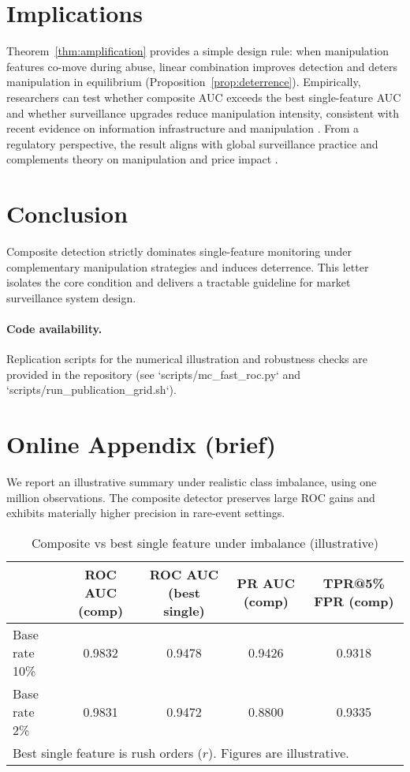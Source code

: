 \documentclass[preprint,12pt,authoryear]{elsarticle}
\begin{document}
\section{Implications}
Theorem~\ref{thm:amplification} provides a simple design rule: when manipulation features co-move during abuse, linear combination improves detection and deters manipulation in equilibrium (Proposition~\ref{prop:deterrence}). Empirically, researchers can test whether composite AUC exceeds the best single-feature AUC and whether surveillance upgrades reduce manipulation intensity, consistent with recent evidence on information infrastructure and manipulation \citep{liu2024asset,xiong2024information,wang2024information}. From a regulatory perspective, the result aligns with global surveillance practice \citep{cumming2008global} and complements theory on manipulation and price impact \citep{huberman2004price}.

\section{Conclusion}
Composite detection strictly dominates single-feature monitoring under complementary manipulation strategies and induces deterrence. This letter isolates the core condition and delivers a tractable guideline for market surveillance system design.

\paragraph{Code availability.} Replication scripts for the numerical illustration and robustness checks are provided in the repository (see `scripts/mc_fast_roc.py` and `scripts/run_publication_grid.sh`).

\section*{Online Appendix (brief)}
We report an illustrative summary under realistic class imbalance, using one million observations. The composite detector preserves large ROC gains and exhibits materially higher precision in rare-event settings.

\begin{table}[htbp]
\centering
\caption{Composite vs best single feature under imbalance (illustrative)}
\label{tab:appendix-imbalance}
\begin{tabular}{lcccc}
\hline
 & ROC AUC (comp) & ROC AUC (best single) & PR AUC (comp) & TPR@5\% FPR (comp) \\
\hline
Base rate 10\% & 0.9832 & 0.9478 & 0.9426 & 0.9318 \\
Base rate 2\%  & 0.9831 & 0.9472 & 0.8800 & 0.9335 \\
\hline
\multicolumn{5}{l}{\footnotesize Best single feature is rush orders ($r$). Figures are illustrative.}
\end{tabular}
\end{table}



\end{document}
